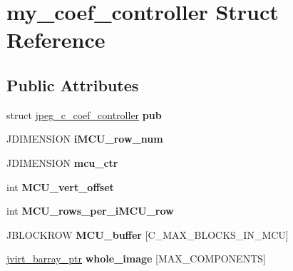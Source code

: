 \hypertarget{structmy__coef__controller}{}\section{my\+\_\+coef\+\_\+controller Struct Reference}
\label{structmy__coef__controller}
\subsection*{Public Attributes}
\begin{DoxyCompactItemize}
\item 
struct \hyperlink{structjpeg__c__coef__controller}{jpeg\+\_\+c\+\_\+coef\+\_\+controller} {\bfseries pub}\hypertarget{structmy__coef__controller_a5585d883f38ce6d73d0d2fb31457f4e5}{}\label{structmy__coef__controller_a5585d883f38ce6d73d0d2fb31457f4e5}

\item 
J\+D\+I\+M\+E\+N\+S\+I\+ON {\bfseries i\+M\+C\+U\+\_\+row\+\_\+num}\hypertarget{structmy__coef__controller_aebf2f540f71a3af44f75544ef474badb}{}\label{structmy__coef__controller_aebf2f540f71a3af44f75544ef474badb}

\item 
J\+D\+I\+M\+E\+N\+S\+I\+ON {\bfseries mcu\+\_\+ctr}\hypertarget{structmy__coef__controller_adfe2cbcbfc3c4760874392d8488d88fd}{}\label{structmy__coef__controller_adfe2cbcbfc3c4760874392d8488d88fd}

\item 
int {\bfseries M\+C\+U\+\_\+vert\+\_\+offset}\hypertarget{structmy__coef__controller_a47e8d96f30f813289b02267601c4a7b4}{}\label{structmy__coef__controller_a47e8d96f30f813289b02267601c4a7b4}

\item 
int {\bfseries M\+C\+U\+\_\+rows\+\_\+per\+\_\+i\+M\+C\+U\+\_\+row}\hypertarget{structmy__coef__controller_a11bc55a8487bfdd201d2ca756d132023}{}\label{structmy__coef__controller_a11bc55a8487bfdd201d2ca756d132023}

\item 
J\+B\+L\+O\+C\+K\+R\+OW {\bfseries M\+C\+U\+\_\+buffer} \mbox{[}C\+\_\+\+M\+A\+X\+\_\+\+B\+L\+O\+C\+K\+S\+\_\+\+I\+N\+\_\+\+M\+CU\mbox{]}\hypertarget{structmy__coef__controller_a9eac536791caff80d2c99c204237b0ee}{}\label{structmy__coef__controller_a9eac536791caff80d2c99c204237b0ee}

\item 
\hyperlink{structjvirt__barray__control}{jvirt\+\_\+barray\+\_\+ptr} {\bfseries whole\+\_\+image} \mbox{[}M\+A\+X\+\_\+\+C\+O\+M\+P\+O\+N\+E\+N\+TS\mbox{]}\hypertarget{structmy__coef__controller_aedc0b0cdda57a7f9e8c49770995b12b4}{}\label{structmy__coef__controller_aedc0b0cdda57a7f9e8c49770995b12b4}


\end{DoxyCompactItemize}
